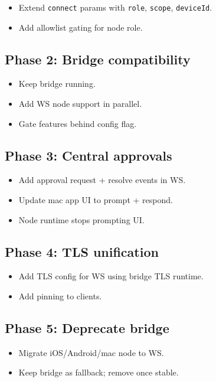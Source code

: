 \begin{itemize}
  \item Extend \texttt{connect} params with \texttt{role}, \texttt{scope}, \texttt{deviceId}.
  \item Add allowlist gating for node role.
\end{itemize}


\subsection{Phase 2: Bridge compatibility}


\begin{itemize}
  \item Keep bridge running.
  \item Add WS node support in parallel.
  \item Gate features behind config flag.
\end{itemize}


\subsection{Phase 3: Central approvals}


\begin{itemize}
  \item Add approval request + resolve events in WS.
  \item Update mac app UI to prompt + respond.
  \item Node runtime stops prompting UI.
\end{itemize}


\subsection{Phase 4: TLS unification}


\begin{itemize}
  \item Add TLS config for WS using bridge TLS runtime.
  \item Add pinning to clients.
\end{itemize}


\subsection{Phase 5: Deprecate bridge}


\begin{itemize}
  \item Migrate iOS/Android/mac node to WS.
  \item Keep bridge as fallback; remove once stable.
\end{itemize}


